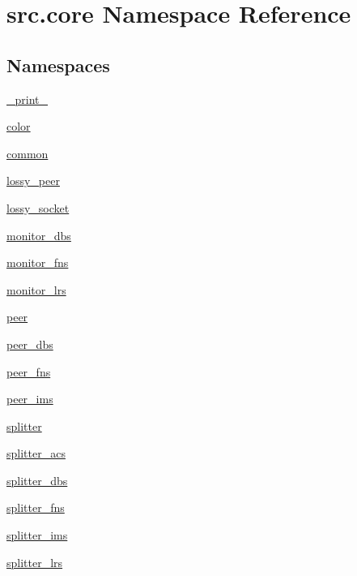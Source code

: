 \hypertarget{namespacesrc_1_1core}{}\section{src.\+core Namespace Reference}
\label{namespacesrc_1_1core}
\subsection*{Namespaces}
\begin{DoxyCompactItemize}
\item 
 \hyperlink{namespacesrc_1_1core_1_1__print__}{\+\_\+print\+\_\+}
\item 
 \hyperlink{namespacesrc_1_1core_1_1color}{color}
\item 
 \hyperlink{namespacesrc_1_1core_1_1common}{common}
\item 
 \hyperlink{namespacesrc_1_1core_1_1lossy__peer}{lossy\+\_\+peer}
\item 
 \hyperlink{namespacesrc_1_1core_1_1lossy__socket}{lossy\+\_\+socket}
\item 
 \hyperlink{namespacesrc_1_1core_1_1monitor__dbs}{monitor\+\_\+dbs}
\item 
 \hyperlink{namespacesrc_1_1core_1_1monitor__fns}{monitor\+\_\+fns}
\item 
 \hyperlink{namespacesrc_1_1core_1_1monitor__lrs}{monitor\+\_\+lrs}
\item 
 \hyperlink{namespacesrc_1_1core_1_1peer}{peer}
\item 
 \hyperlink{namespacesrc_1_1core_1_1peer__dbs}{peer\+\_\+dbs}
\item 
 \hyperlink{namespacesrc_1_1core_1_1peer__fns}{peer\+\_\+fns}
\item 
 \hyperlink{namespacesrc_1_1core_1_1peer__ims}{peer\+\_\+ims}
\item 
 \hyperlink{namespacesrc_1_1core_1_1splitter}{splitter}
\item 
 \hyperlink{namespacesrc_1_1core_1_1splitter__acs}{splitter\+\_\+acs}
\item 
 \hyperlink{namespacesrc_1_1core_1_1splitter__dbs}{splitter\+\_\+dbs}
\item 
 \hyperlink{namespacesrc_1_1core_1_1splitter__fns}{splitter\+\_\+fns}
\item 
 \hyperlink{namespacesrc_1_1core_1_1splitter__ims}{splitter\+\_\+ims}
\item 
 \hyperlink{namespacesrc_1_1core_1_1splitter__lrs}{splitter\+\_\+lrs}
\end{DoxyCompactItemize}
